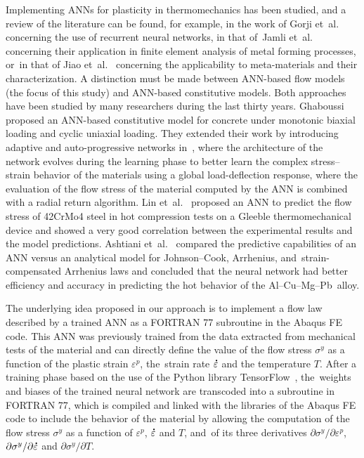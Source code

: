 \documentclass[algorithms,article,accept,pdftex,moreauthors]{Definitions/mdpi}
\DeclareRobustCommand{\mdot}[1]{\accentset{\mbox{\bfseries .}}{#1}}
\begin{document}
Implementing ANNs for plasticity in thermomechanics has been studied, and a review of the literature can be found, for example, in the work of Gorji et~al.~\cite{Gorji-2020} concerning the use of recurrent neural networks, in that of~Jamli et~al.~\cite{Jamli-2019-SNN} concerning their application in finite element analysis of metal forming processes, or~in that of Jiao et~al.~\cite{Jiao-2020} concerning the applicability to meta-materials and their characterization.
A distinction must be made between ANN-based flow models (the focus of this study) and ANN-based constitutive models.
Both approaches have been studied by many researchers during the last thirty years.
Ghaboussi~\cite{Ghaboussi-1991} proposed an ANN-based constitutive model for concrete under monotonic biaxial loading and cyclic uniaxial loading.
They extended their work by introducing adaptive and auto-progressive networks in~\cite{Ghaboussi-1998, Ghaboussi-1998-NNA}, where the architecture of the network evolves during the learning phase to better learn the complex stress--strain behavior of the materials using a global load-deflection response, where the evaluation of the flow stress of the material computed by the ANN is combined with a radial return algorithm.
Lin et~al.~\cite{Lin-2008} proposed an ANN to predict the flow stress of 42CrMo4 steel in hot compression tests on a Gleeble thermomechanical device and showed a very good correlation between the experimental results and the model predictions.
Ashtiani et~al.~\cite{Ashtiani-2016} compared the predictive capabilities of an ANN versus an analytical model for Johnson--Cook, Arrhenius, and~strain-compensated Arrhenius laws and concluded that the neural network had better efficiency and accuracy in predicting the hot behavior of the Al--Cu--Mg--Pb~alloy.

The underlying idea proposed in our approach is to implement a flow law described by a trained ANN as a FORTRAN 77 subroutine in the Abaqus FE code.
This ANN was previously trained from the data extracted from mechanical tests of the material and can directly define the value of the flow stress $\sigma^y$ as a function of the plastic strain $\varepsilon^p$, the~strain rate $\mdot\varepsilon$ and the temperature $T$.
After a training phase based on the use of the Python library TensorFlow~\cite{Abadi-2016, Mattmann-2020}, the~weights and biases of the trained neural network are transcoded into a subroutine in FORTRAN 77, which is compiled and linked with the libraries of the Abaqus FE code to include the behavior of the material by allowing the computation of the flow stress $\sigma^y$ as a function of $\varepsilon^p$, $\mdot\varepsilon$ and $T$, and~of its three derivatives $\partial\sigma^y/\partial\varepsilon^p$, $\partial\sigma^y/\partial\mdot\varepsilon$ and $\partial\sigma^y/\partial T$.
\end{document}
